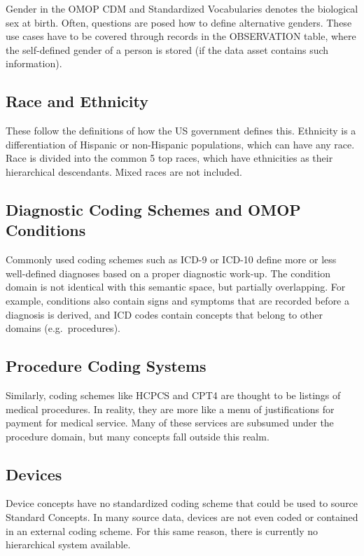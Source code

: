 \documentclass[11pt]{book}
\theoremstyle{definition}
\theoremstyle{definition}
\theoremstyle{definition}
\theoremstyle{remark}
\begin{document}
Gender in the OMOP CDM and Standardized Vocabularies denotes the
biological sex at birth. Often, questions are posed how to define
alternative genders. These use cases have to be covered through records
in the OBSERVATION table, where the self-defined gender of a person is
stored (if the data asset contains such information).

\subsection{Race and Ethnicity}\label{race-and-ethnicity}

These follow the definitions of how the US government defines this.
Ethnicity is a differentiation of Hispanic or non-Hispanic populations,
which can have any race. Race is divided into the common 5 top races,
which have ethnicities as their hierarchical descendants. Mixed races
are not included.

\subsection{Diagnostic Coding Schemes and OMOP
Conditions}\label{diagnostic-coding-schemes-and-omop-conditions}

Commonly used coding schemes such as ICD-9 or ICD-10 define more or less
well-defined diagnoses based on a proper diagnostic work-up. The
condition domain is not identical with this semantic space, but
partially overlapping. For example, conditions also contain signs and
symptoms that are recorded before a diagnosis is derived, and ICD codes
contain concepts that belong to other domains (e.g.~procedures).

\subsection{Procedure Coding Systems}\label{procedure-coding-systems}

Similarly, coding schemes like HCPCS and CPT4 are thought to be listings
of medical procedures. In reality, they are more like a menu of
justifications for payment for medical service. Many of these services
are subsumed under the procedure domain, but many concepts fall outside
this realm.

\subsection{Devices}\label{devices}

Device concepts have no standardized coding scheme that could be used to
source Standard Concepts. In many source data, devices are not even
coded or contained in an external coding scheme. For this same reason,
there is currently no hierarchical system available.
\end{document}
